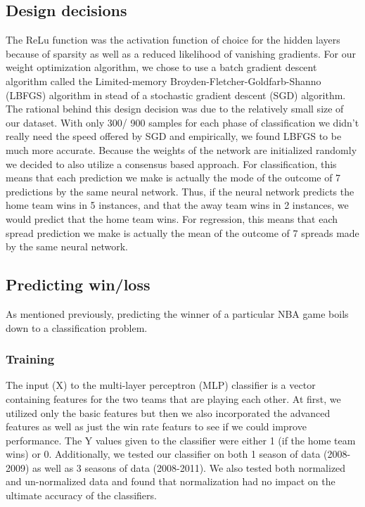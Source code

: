 \documentclass{article}
\begin{document}
\subsection{Design decisions}
The ReLu function was the activation function of choice for the hidden layers because of sparsity as well as a reduced likelihood of vanishing gradients. For our weight optimization algorithm, we chose to use a batch gradient descent algorithm called the Limited-memory Broyden-Fletcher-Goldfarb-Shanno (LBFGS) algorithm in stead of a stochastic gradient descent (SGD) algorithm. The rational behind this design decision was due to the relatively small size of our dataset. With only 300/ 900 samples for each phase of classification we didn't really need the speed offered by SGD and empirically, we found LBFGS to be much more accurate. Because the weights of the network are initialized randomly we decided to also utilize a consensus based approach. For classification, this means that each prediction we make is actually the mode of the outcome of 7 predictions by the same neural network. Thus, if the neural network predicts the home team wins in 5 instances, and that the away team wins in 2 instances, we would predict that the home team wins. For regression, this means that each spread prediction we make is actually the mean of the outcome of 7 spreads made by the same neural network.

\subsection{Predicting win/loss}
As mentioned previously, predicting the winner of a particular NBA game boils down to a classification problem.

\subsubsection{Training}
The input (X) to the multi-layer perceptron (MLP) classifier is a vector containing features for the two teams that are playing each other. At first, we utilized only the basic features but then we also incorporated the advanced features as well as just the win rate featurs to see if we could improve performance. The Y values given to the classifier were either 1 (if the home team wins) or 0. Additionally, we tested our classifier on both 1 season of data (2008-2009) as well as 3 seasons of data (2008-2011). We also tested both normalized and un-normalized data and found that normalization had no impact on the ultimate accuracy of the classifiers.
\end{document}
